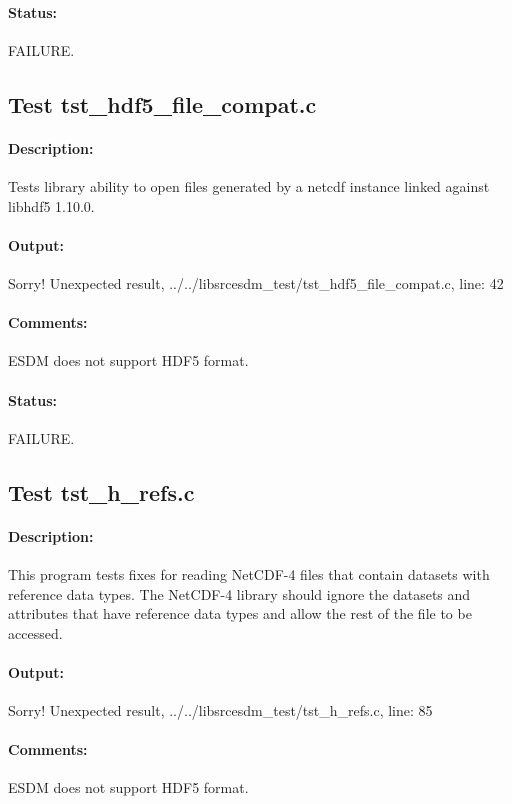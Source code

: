 \paragraph{Status:} FAILURE.

\subsection{Test tst\_hdf5\_file\_compat.c}

\paragraph{Description:} Tests library ability to open files generated by a netcdf instance linked against libhdf5 1.10.0.

\paragraph{Output:} Sorry! Unexpected result, ../../libsrcesdm\_test/tst\_hdf5\_file\_compat.c, line: 42

\paragraph{Comments:} ESDM does not support HDF5 format.

\paragraph{Status:} FAILURE.

\subsection{Test tst\_h\_refs.c}

\paragraph{Description:} This program tests fixes for reading NetCDF-4 files that contain datasets with reference data types.
The NetCDF-4 library should ignore the datasets and attributes that have reference data types and allow the rest of the file to be accessed.

\paragraph{Output:} Sorry! Unexpected result, ../../libsrcesdm\_test/tst\_h\_refs.c, line: 85

\paragraph{Comments:} ESDM does not support HDF5 format.

